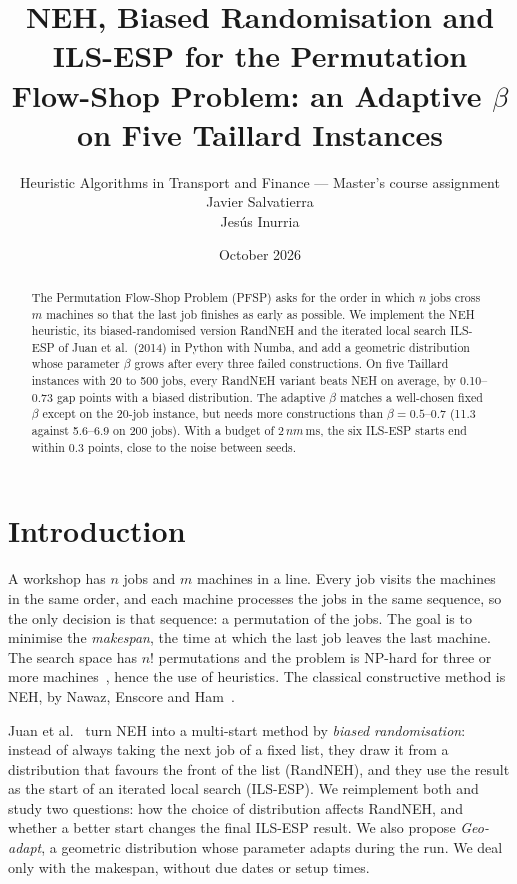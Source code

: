 \documentclass[10pt,a4paper]{article}
\title{\vspace{-1.2cm}\bfseries NEH, Biased Randomisation and ILS-ESP for the Permutation\\
Flow-Shop Problem: an Adaptive $\beta$ on Five Taillard Instances}
\author{Heuristic Algorithms in Transport and Finance --- Master's course assignment \\
    Javier Salvatierra \\
    Jesús Inurria
}
\date{October 2026}
\begin{document}
\maketitle
\vspace{-0.8cm}

\begin{abstract}
\noindent\small
The Permutation Flow-Shop Problem (PFSP) asks for the order in which $n$ jobs cross $m$ machines so that
the last job finishes as early as possible. We implement the NEH heuristic, its biased-randomised
version RandNEH and the iterated local search ILS-ESP of Juan et al.\ (2014) in Python with Numba, and
add a geometric distribution whose parameter $\beta$ grows after every three failed constructions. On
five Taillard instances with 20 to 500 jobs, every RandNEH variant beats NEH on average, by 0.10--0.73
gap points with a biased distribution. The adaptive $\beta$ matches a well-chosen fixed $\beta$ except
on the 20-job instance, but needs more constructions than $\beta=0.5$--$0.7$ (11.3 against 5.6--6.9 on 200
jobs). With a budget of $2\,nm$\,ms, the six ILS-ESP starts end within 0.3 points, close to the noise
between seeds.
\end{abstract}

\section{Introduction}

A workshop has $n$ jobs and $m$ machines in a line. Every job visits the machines in the same order,
and each machine processes the jobs in the same sequence, so the only decision is that sequence: a
permutation of the jobs. The goal is to minimise the \emph{makespan}, the time at which the last job
leaves the last machine. The search space has $n!$ permutations and the problem is NP-hard for three or more
machines~\cite{garey1976}, hence the use of heuristics. The classical
constructive method is NEH, by Nawaz, Enscore and Ham~\cite{neh1983}.

Juan et al.~\cite{juan2014} turn NEH into a multi-start method by \emph{biased randomisation}: instead
of always taking the next job of a fixed list, they draw it from a distribution that favours the front
of the list (RandNEH), and they use the result as the start of an iterated local search (ILS-ESP). We
reimplement both and study two questions: how the choice of distribution affects RandNEH, and whether a
better start changes the final ILS-ESP result. We also propose \emph{Geo-adapt}, a geometric
distribution whose parameter adapts during the run. We deal only with the makespan, without due dates or
setup times.
\end{document}
